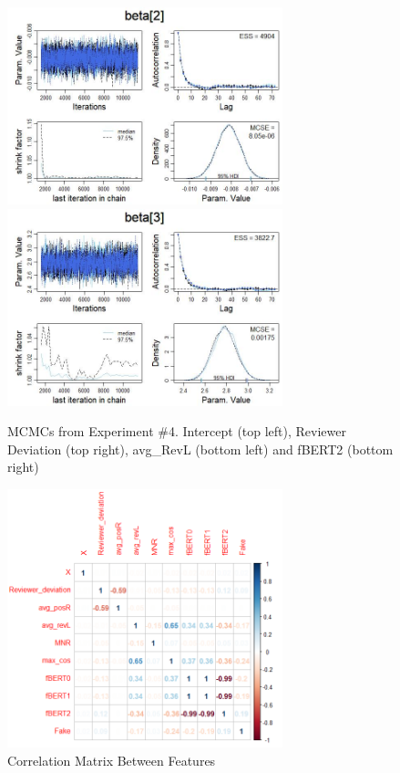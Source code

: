 \documentclass[man, floatsintext, 10pt]{apa6}
\begin{document}
\begin{figure}
\includegraphics[width=8cm]{AvgRevLenExp4.jpg}
\includegraphics[width=8cm]{BERTExp4.jpg}
\caption{MCMCs from Experiment \#4. Intercept (top left), Reviewer Deviation (top right), avg\_RevL (bottom left) and fBERT2 (bottom right)}
  \label{Exp4MCMC}
\end{figure}

\begin{figure}
\includegraphics[width=8cm]{corrplot.png}
\caption{Correlation Matrix Between Features}
  \label{corr}
\end{figure}
\end{document}
